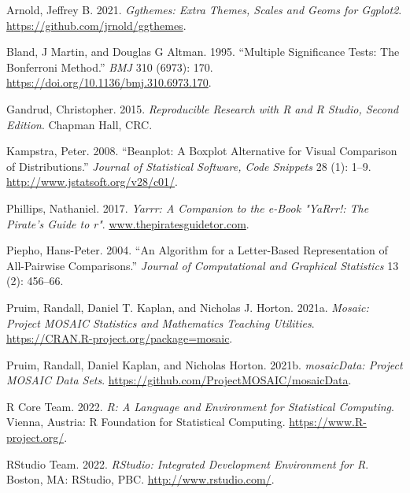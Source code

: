 \documentclass[
]{book}
\newlength{\cslhangindent}
\newlength{\cslentryspacingunit} %
\newenvironment{CSLReferences}[2] %
 {%
  \setlength{\parindent}{0pt}
  \ifodd #1
  \let\oldpar\par
  \def\par{\hangindent=\cslhangindent\oldpar}
  \fi
  \setlength{\parskip}{#2\cslentryspacingunit}
 }%
 {}
\begin{document}
\hypertarget{refs}{}
\begin{CSLReferences}{1}{0}
\leavevmode{}%
Arnold, Jeffrey B. 2021. \emph{Ggthemes: Extra Themes, Scales and Geoms for Ggplot2}. \url{https://github.com/jrnold/ggthemes}.

\leavevmode{}%
Bland, J Martin, and Douglas G Altman. 1995. {``Multiple Significance Tests: The Bonferroni Method.''} \emph{BMJ} 310 (6973): 170. \url{https://doi.org/10.1136/bmj.310.6973.170}.

\leavevmode{}%
Gandrud, Christopher. 2015. \emph{Reproducible Research with {R} and {R} {Studio}, Second Edition}. Chapman Hall, CRC.

\leavevmode{}%
Kampstra, Peter. 2008. {``Beanplot: A Boxplot Alternative for Visual Comparison of Distributions.''} \emph{Journal of Statistical Software, Code Snippets} 28 (1): 1--9. \url{http://www.jstatsoft.org/v28/c01/}.

\leavevmode{}%
Phillips, Nathaniel. 2017. \emph{Yarrr: A Companion to the e-Book "YaRrr!: The Pirate's Guide to r"}. \href{https://www.thepiratesguidetor.com}{www.thepiratesguidetor.com}.

\leavevmode{}%
Piepho, Hans-Peter. 2004. {``An Algorithm for a Letter-Based Representation of All-Pairwise Comparisons.''} \emph{Journal of Computational and Graphical Statistics} 13 (2): 456--66.

\leavevmode{}%
Pruim, Randall, Daniel T. Kaplan, and Nicholas J. Horton. 2021a. \emph{Mosaic: Project MOSAIC Statistics and Mathematics Teaching Utilities}. \url{https://CRAN.R-project.org/package=mosaic}.

\leavevmode{}%
Pruim, Randall, Daniel Kaplan, and Nicholas Horton. 2021b. \emph{mosaicData: Project MOSAIC Data Sets}. \url{https://github.com/ProjectMOSAIC/mosaicData}.

\leavevmode{}%
R Core Team. 2022. \emph{R: A Language and Environment for Statistical Computing}. Vienna, Austria: R Foundation for Statistical Computing. \url{https://www.R-project.org/}.

\leavevmode{}%
RStudio Team. 2022. \emph{RStudio: Integrated Development Environment for {R}}. Boston, MA: RStudio, PBC. \url{http://www.rstudio.com/}.


\end{CSLReferences}
\end{document}
